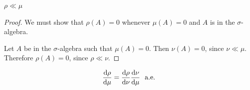 \begin{claim*}
  $\rho \ll \mu$
\end{claim*}
\begin{proof}
  We must show that $\rho(A) = 0$ whenever $\mu(A) = 0$ and $A$ is in the $\sigma$-algebra.

  Let $A$ be in the $\sigma$-algebra such that $\mu(A) = 0$. Then $\nu(A) = 0$, since $\nu \ll \mu$.
  Therefore $\rho(A) = 0$, since $\rho \ll \nu$.
\end{proof}

\begin{claim*}
  \begin{align*}
    \frac{\d\rho}{\d\mu} = \frac{\d\rho}{\d\nu}\frac{\d\nu}{\d\mu} \ae
  \end{align*}
\end{claim*}


